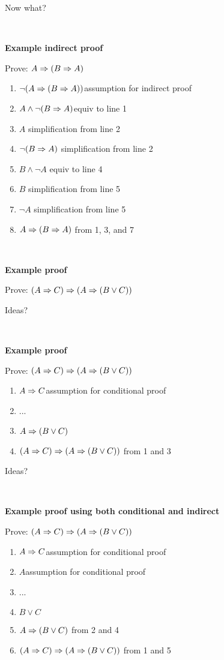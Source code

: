 \documentclass{article}
\newcommand{\ti}[1]{
\mbox{~}

\vspace{1.25in}
\centerline{\bf #1}}
\begin{document}
\bigskip
Now what?

\newpage
\ti{Example indirect proof}
Prove: $A\Rightarrow (B\Rightarrow A)$

\begin{enumerate}
\item \ind$\neg(A\Rightarrow (B\Rightarrow A))$\hfill assumption for indirect proof
\item \ind $A \land \neg (B\Rightarrow A)$\hfill equiv to line 1
\item \ind $A$ \hfill simplification from line 2
\item \ind $\neg (B\Rightarrow A)$ \hfill  simplification from line 2
\item \ind $B\land \neg A$ \hfill equiv to line 4
\item \ind $B$ \hfill simplification from line 5
\item \ind $\neg A$ \hfill simplification from line 5
\item $A\Rightarrow (B\Rightarrow A)$ \hfill from 1, 3, and 7
\end{enumerate}

\bigskip

\newpage
\ti{Example proof}
Prove: $(A\Rightarrow C) \Rightarrow (A\Rightarrow (B\lor C))$

\bigskip
Ideas?

\newpage
\ti{Example proof}
Prove: $(A\Rightarrow C) \Rightarrow (A\Rightarrow (B\lor C))$
\begin{enumerate}
\item \ind $A\Rightarrow C$\hfill assumption for conditional proof
\item \ind...
\item \ind $A\Rightarrow (B\lor C)$
\item $(A\Rightarrow C) \Rightarrow (A\Rightarrow (B\lor C))$ \hfill from 1 and 3
\end{enumerate}

\bigskip
Ideas?

\newpage
\ti{Example proof using both conditional and indirect}
Prove: $(A\Rightarrow C) \Rightarrow (A\Rightarrow (B\lor C))$
\begin{enumerate}
\item \ind $A\Rightarrow C$\hfill assumption for conditional proof
\item \ind\ind $A$\hfill assumption for conditional proof
\item \ind\ind...
\item \ind\ind $B\lor C$
\item \ind $A\Rightarrow (B\lor C)$ \hfill from 2 and 4
\item $(A\Rightarrow C) \Rightarrow (A\Rightarrow (B\lor C))$ \hfill from 1 and 5
\end{enumerate}
\end{document}
